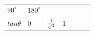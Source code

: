 {\begin{tabular}[t]{|l|l|l|l|l|l|l|}
        
                  \begin{math}{90}^{\circ }\end{math}
                 &
    
    
        
                  \begin{math}{180}^{\circ }\end{math}
     \tabularnewline\cline{1-1}\cline{2-2}\cline{3-3}\cline{4-4}\cline{5-5}\cline{6-6}\cline{7-7}
    
    
        
                  \begin{math}tan\theta \end{math}
                 &
    
    
        0 &
    
    
        
                  \begin{math}\frac{1}{\sqrt{3}}\end{math}
                 &
    
    
        1 &
    
    

\end{tabular}}
